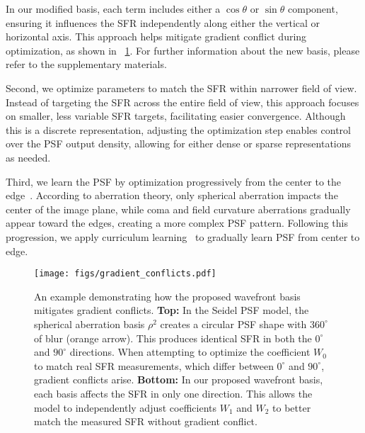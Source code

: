 In our modified basis, each term includes either a $\cos \theta$ or $\sin \theta$ component, ensuring it influences the SFR independently along either the vertical or horizontal axis. This approach helps mitigate gradient conflict during optimization, as shown in ~\cref{fig:toy}. For further information about the new basis, please refer to the supplementary materials.


Second, we optimize parameters to match the SFR within narrower field of view. Instead of targeting the SFR across the entire field of view, this approach focuses on smaller, less variable SFR targets, facilitating easier convergence. Although this is a discrete representation, adjusting the optimization step enables control over the PSF output density, allowing for either dense or sparse representations as needed.

Third, we learn the PSF by optimization progressively from the center to the edge~\cite{shi2023deep}. According to aberration theory, only spherical aberration impacts the center of the image plane, while coma and field curvature aberrations gradually appear toward the edges, creating a more complex PSF pattern. Following this progression, we apply curriculum learning~\cite{bengio2009curriculum} to gradually learn PSF from center to edge.




\begin{figure}[t]
\centering
\vspace{-0.0cm} 
    \texttt{[image: figs/gradient\_conflicts.pdf]}
    \setlength{\abovecaptionskip}{-0.0cm} 
    \caption{An example demonstrating how the proposed wavefront basis mitigates gradient conflicts. \textbf{Top:} In the Seidel PSF model, the spherical aberration basis $\rho^2$ creates a circular PSF shape with $360^\circ$ of blur (orange arrow). This produces identical SFR in both the $0^\circ$ and $90^\circ$ directions. When attempting to optimize the coefficient $W_0$  to match real SFR measurements, which differ between $0^\circ$ and $90^\circ$, gradient conflicts arise. \textbf{Bottom:} In our proposed wavefront basis, each basis affects the SFR in only one direction. This allows the model to independently adjust coefficients $W_1$ and $W_2$ to better match the measured SFR without gradient conflict.
}
    \vspace{-0.0cm} 
    \label{fig:toy}
\end{figure}


